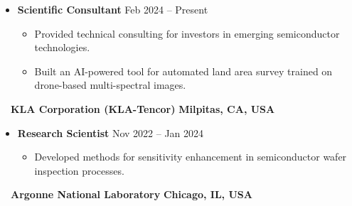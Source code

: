\documentclass[10.5pt]{article}
\begin{document}
\begin{itemize}
    \item
        \textbf{Scientific Consultant}
        \hfill  {Feb 2024 -- Present} \par
        \begin{itemize}
            \item Provided technical consulting for investors in emerging semiconductor technologies. 
            \item Built an AI-powered tool for automated land area survey trained on drone-based multi-spectral images. 
        \end{itemize}
\end{itemize} ~~{\color{black}\textbf{KLA Corporation (KLA-Tencor)} \hfill  \textbf{Milpitas, CA, USA}}\par
\begin{itemize}
    \item
        \textbf{Research Scientist}
        \hfill  {Nov 2022 -- Jan 2024} \par
        \begin{itemize}
            \item Developed methods for sensitivity enhancement in semiconductor wafer inspection processes. 
        \end{itemize}
\end{itemize} ~~{\color{black}\textbf{Argonne National Laboratory} \hfill  \textbf{Chicago, IL, USA}}\par
\end{document}

